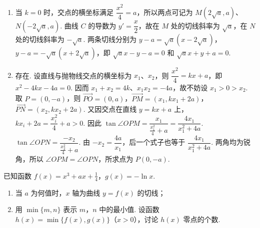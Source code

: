 \begin{solution}
\begin{enumerate}
\item 当 \(k=0\) 时，交点的横坐标满足 \(\dfrac{x^2}{4}=a\)，所以两点可记为 \(M(2\sqrt a,a)\)、\(N(-2\sqrt a,a)\). 曲线 \(C\) 的导数为 \(y'=\dfrac{x}{2}\)，故在 \(M\) 处的切线斜率为 \(\sqrt a\)，在 \(N\) 处的切线斜率为 \(-\sqrt a\). 两条切线分别为
\(y-a=\sqrt a(x-2\sqrt a)\)，\(y-a=-\sqrt a(x+2\sqrt a)\)，即 \(\sqrt a x-y-a=0\) 和 \(\sqrt a x+y+a=0\).
\item 存在. 设直线与抛物线交点的横坐标为 \(x_1\)、\(x_2\)，则
	\(\dfrac{x^2}{4}=kx+a\)，即 \(x^2-4kx-4a=0\). 因而 \(x_1+x_2=4k\)、\(x_1x_2=-4a\)，故不妨设 \(x_1>0>x_2\). 取 \(P=(0,-a)\)，则
\(\overrightarrow{PO}=(0,a)\)，\(\overrightarrow{PM}=(x_1,kx_1+2a)\)，\(\overrightarrow{PN}=(x_2,kx_2+2a)\). 又因交点在直线 \(y=kx+a\) 上，\(kx_i+2a=\dfrac{x_i^2}{4}+a>0\). 因此
\(\tan\angle OPM=\dfrac{x_1}{\frac{x_1^2}{4}+a}=\dfrac{4x_1}{x_1^2+4a}\).
\(\tan\angle OPN=\dfrac{-x_2}{\frac{x_2^2}{4}+a}\). 由 \(-x_2=\dfrac{4a}{x_1}\)，后一个式子也等于 \(\dfrac{4x_1}{x_1^2+4a}\). 两角均为锐角，所以 \(\angle OPM=\angle OPN\)，所求点为 \(P(0,-a)\).
\end{enumerate}
\end{solution}

\begin{problem}
已知函数 \(f(x) = x^3 + ax + \frac{1}{4}\)，\(g(x) = -\ln x\).

\begin{enumerate}
\item 当 \(a\) 为何值时，\(x\) 轴为曲线 \(y = f(x)\) 的切线；
\item 用 \(\min \{m, n\}\) 表示 \(m\)，\(n\) 中的最小值. 设函数 \(h(x) = \min \{f(x), g(x)\}\)（\(x > 0\)），讨论 \(h(x)\) 零点的个数.
\end{enumerate}
\end{problem}

